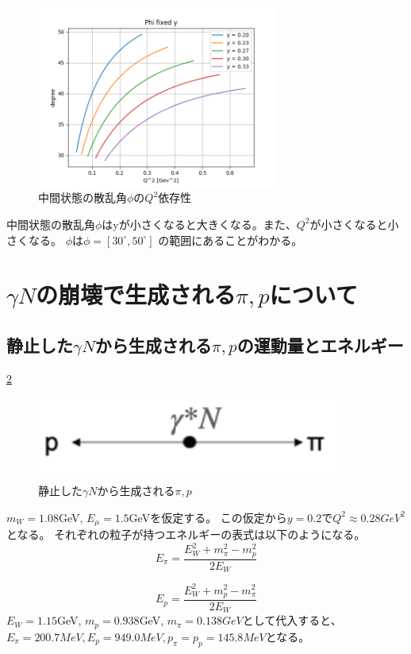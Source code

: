 \begin{figure}[H]
    \centering
    \includegraphics[width=8cm]{img/Phi_degree_fixed_y.png}
    \caption{中間状態の散乱角$\phi$の$Q^2$依存性}
    \label{fig:angle4}
\end{figure}

中間状態の散乱角$\phi$はyが小さくなると大きくなる。また、$Q^2$が小さくなると小さくなる。
$\phi$は$\phi = [30^\circ, 50^\circ]$ の範囲にあることがわかる。

\section{\texorpdfstring{$\gamma N$の崩壊で生成される$\pi, p$について}{LG}}
\subsection{静止した$\gamma N$から生成される$\pi,p$の運動量とエネルギー}\ref{fig:angle5}
\begin{figure}[H]
    \centering
    \includegraphics[width=10cm]{img/rest_middle_situation.png}
    \caption{静止した$\gamma N$から生成される$\pi,p$}
    \label{fig:angle5}
\end{figure}
$m_W = 1.08$GeV, $E_\mu = 1.5$GeVを仮定する。
この仮定から$y = 0.2$で$Q^2 \approx 0.28 GeV^2$となる。
それぞれの粒子が持つエネルギーの表式は以下のようになる。
\begin{equation}
    E_\pi = \dfrac{E_W ^2 + m_\pi ^2 - m_p ^2}{2E_W}
\end{equation}

\begin{equation}
    E_p = \dfrac{E_W ^2 + m_p ^2 - m_\pi ^2}{2E_W}
\end{equation}
$E_W = 1.15$GeV, $m_p = 0.938$GeV, $m_\pi = 0.138GeV$として代入すると、
$E_π = 200.7 MeV , E_p = 949.0 MeV , p_π = p_p = 145.8 MeV$となる。


